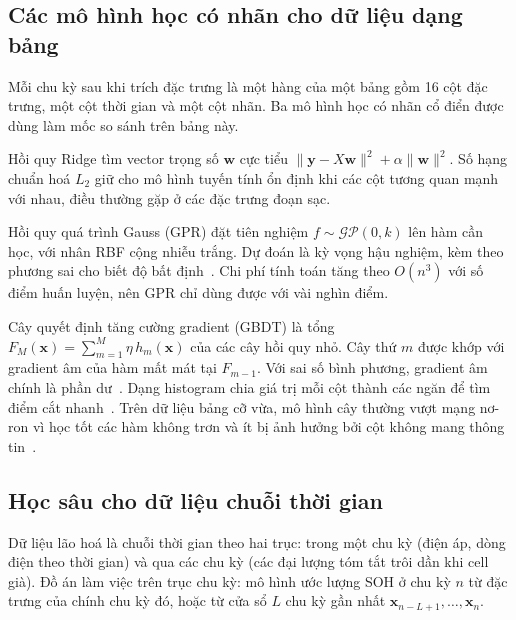 \subsection{Các mô hình học có nhãn cho dữ liệu dạng bảng}\label{sec:lt_bang}

Mỗi chu kỳ sau khi trích đặc trưng là một hàng của một bảng gồm 16 cột đặc trưng, một cột thời gian và một cột nhãn. Ba
mô hình học có nhãn cổ điển được dùng làm mốc so sánh trên bảng này.

Hồi quy Ridge tìm vector trọng số $\mathbf{w}$ cực tiểu $\|\mathbf{y} - X\mathbf{w}\|^2 + \alpha\|\mathbf{w}\|^2$. Số
hạng chuẩn hoá $L_2$ giữ cho mô hình tuyến tính ổn định khi các cột tương quan mạnh với nhau, điều thường gặp ở các đặc
trưng đoạn sạc.

Hồi quy quá trình Gauss (GPR) đặt tiên nghiệm $f \sim \mathcal{GP}(0, k)$ lên hàm cần học, với nhân RBF cộng nhiễu trắng.
Dự đoán là kỳ vọng hậu nghiệm, kèm theo phương sai cho biết độ bất định~\cite{rasmussen2006}. Chi phí tính toán tăng theo
$O(n^3)$ với số điểm huấn luyện, nên GPR chỉ dùng được với vài nghìn điểm.

Cây quyết định tăng cường gradient (GBDT) là tổng $F_M(\mathbf{x}) = \sum_{m=1}^{M} \eta\, h_m(\mathbf{x})$ của các cây
hồi quy nhỏ. Cây thứ $m$ được khớp với gradient âm của hàm mất mát tại $F_{m-1}$. Với sai số bình phương, gradient âm
chính là phần dư~\cite{friedman2001}. Dạng histogram chia giá trị mỗi cột thành các ngăn để tìm điểm cắt
nhanh~\cite{ke2017}. Trên dữ liệu bảng cỡ vừa, mô hình cây thường vượt mạng nơ-ron vì học tốt các hàm không trơn và ít
bị ảnh hưởng bởi cột không mang thông tin~\cite{grinsztajn2022}.

\subsection{Học sâu cho dữ liệu chuỗi thời gian}\label{sec:lt_chuoi}

Dữ liệu lão hoá là chuỗi thời gian theo hai trục: trong một chu kỳ (điện áp, dòng điện theo thời gian) và qua các chu kỳ
(các đại lượng tóm tắt trôi dần khi cell già). Đồ án làm việc trên trục chu kỳ: mô hình ước lượng SOH ở chu kỳ $n$ từ
đặc trưng của chính chu kỳ đó, hoặc từ cửa sổ $L$ chu kỳ gần nhất $\mathbf{x}_{n-L+1}, \dots, \mathbf{x}_n$.

